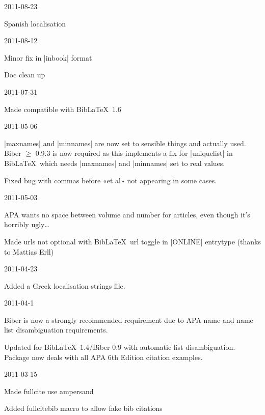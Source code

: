 \documentclass{ltxdockit}
\begin{document}
\begin{changelog}
\begin{release}{3.3}{2011-08-23}
\item Spanish localisation
\end{release}

\begin{release}{3.2}{2011-08-12}
\item Minor fix in |inbook| format
\item Doc clean up
\end{release}

\begin{release}{3.1}{2011-07-31}
\item Made compatible with Bib\LaTeX\ 1.6
\end{release}

\begin{release}{3.0}{2011-05-06}
\item |maxnames| and |minnames| are now set to sensible things and actually
  used. Biber $\geq$ 0.9.3 is now required as this implements a fix for
  |uniquelist| in Bib\LaTeX\ which needs |maxnames| and |minnames| set to
  real values.
\item Fixed bug with commas before «et al» not appearing in some cases.
\end{release}

\begin{release}{2.9}{2011-05-03}
\item APA wants no space between volume and number for articles, even though it's
  horribly ugly\ldots
\item Made urls not optional with Bib\LaTeX\ url toggle in |ONLINE| entrytype (thanks to Mattias Erll)
\end{release}

\begin{release}{2.8}{2011-04-23}
\item Added a Greek localisation strings file.
\end{release}

\begin{release}{2.7}{2011-04-1}
\item Biber is now a strongly recommended requirement due to APA name and
  name list disambiguation requirements.
\item Updated for Bib\LaTeX\ 1.4/Biber 0.9 with automatic list
  disambiguation. Package now deals with all APA 6th Edition citation examples.
\end{release}

\begin{release}{2.6}{2011-03-15}
\item Made fullcite use ampersand
\item Added fullcitebib macro to allow fake bib citations
\end{release}


\end{changelog}
\end{document}
